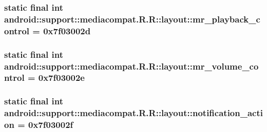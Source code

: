 \hypertarget{classandroid_1_1support_1_1mediacompat_1_1_r_1_1layout_d694525c65fa2c28567615e353295575}{
\subsubsection[{mr\_\-playback\_\-control}]{\setlength{\rightskip}{0pt plus 5cm}static final int android::support::mediacompat.R.R::layout::mr\_\-playback\_\-control = 0x7f03002d}}
\label{classandroid_1_1support_1_1mediacompat_1_1_r_1_1layout_d694525c65fa2c28567615e353295575}


\hypertarget{classandroid_1_1support_1_1mediacompat_1_1_r_1_1layout_bd3e479579173693faaa0370adeff515}{
\subsubsection[{mr\_\-volume\_\-control}]{\setlength{\rightskip}{0pt plus 5cm}static final int android::support::mediacompat.R.R::layout::mr\_\-volume\_\-control = 0x7f03002e}}
\label{classandroid_1_1support_1_1mediacompat_1_1_r_1_1layout_bd3e479579173693faaa0370adeff515}


\hypertarget{classandroid_1_1support_1_1mediacompat_1_1_r_1_1layout_29c15522984b36895767ca04e42ee8aa}{
\subsubsection[{notification\_\-action}]{\setlength{\rightskip}{0pt plus 5cm}static final int android::support::mediacompat.R.R::layout::notification\_\-action = 0x7f03002f}}
\label{classandroid_1_1support_1_1mediacompat_1_1_r_1_1layout_29c15522984b36895767ca04e42ee8aa}



